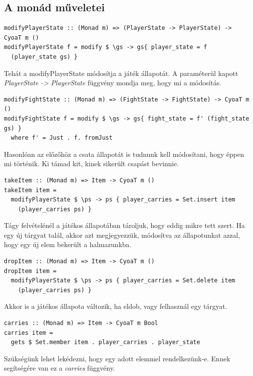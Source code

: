 \documentclass[12pt,a4paper,oneside]{report}
\begin{document}
    \subsection{A monád műveletei}
    \begin{verbatim}
modifyPlayerState :: (Monad m) => (PlayerState -> PlayerState) ->
CyoaT m ()
modifyPlayerState f = modify $ \gs -> gs{ player_state = f
  (player_state gs) }
    \end{verbatim}
    Tehát a modifyPlayerState módosítja a játék állapotát. A
    paraméterül kapott \emph{PlayerState -> PlayerState} függvény mondja meg,
    hogy mi a módosítás.
    \begin{verbatim}
modifyFightState :: (Monad m) => (FightState -> FightState) -> CyoaT m ()
modifyFightState f = modify $ \gs -> gs{ fight_state = f' (fight_state gs) }
  where f' = Just . f. fromJust
      \end{verbatim}
    Hasonlóan az előzőhöz a csata állapotát is tudnunk kell
    módosítani, hogy éppen mi történik. Ki támad kit, kinek sikerült
    csapást bevinnie.

    \begin{verbatim}
takeItem :: (Monad m) => Item -> CyoaT m ()
takeItem item =
  modifyPlayerState $ \ps -> ps { player_carries = Set.insert item
    (player_carries ps) }
    \end{verbatim}
    Tágy felvételénél a játékos állapotában tároljuk, hogy eddig mikre
    tett szert. Ha egy új tárgyat talál, akkor azt
    megjegyezzük, módosítva az állapotunkat azzal, hogy egy új elem
    bekerült a halmazunkba.

    \begin{verbatim}
dropItem :: (Monad m) => Item -> CyoaT m ()
dropItem item =
  modifyPlayerState $ \ps -> ps { player_carries = Set.delete item
    (player_carries ps) }
    \end{verbatim}
    Akkor is a játékos állapota változik, ha eldob, vagy felhasznál egy tárgyat.

    \begin{verbatim}
carries :: (Monad m) => Item -> CyoaT m Bool
carries item =
  gets $ Set.member item . player_carries . player_state
    \end{verbatim}
    Szükségünk lehet lekédezni, hogy egy adott elemmel
    rendelkezünk-e. Ennek segítségére van ez a \emph{carries} függvény.
\end{document}
